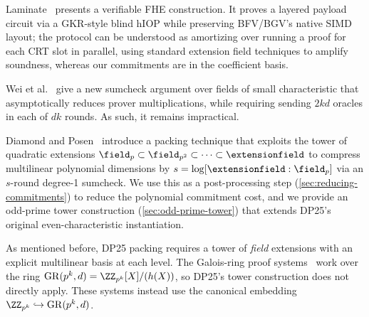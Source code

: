 
Laminate~\cite{EPRINT:PLFT25} presents a verifiable FHE construction. It proves a layered payload circuit via a GKR-style blind hIOP while preserving BFV/BGV's native SIMD layout; the protocol can be understood as amortizing over running a proof for each CRT slot in parallel, using standard extension field techniques to amplify soundness, whereas our commitments are in the coefficient basis.

Wei et al.~\cite{EPRINT:WWXZDZ25} give a new sumcheck argument over fields of small characteristic that asymptotically reduces prover multiplications, while requiring sending $2kd$ oracles in each of $dk$ rounds. As such, it remains impractical.

Diamond and Posen~\cite{EC:DiaPos25} introduce a packing technique that exploits the tower of quadratic extensions $\field_p \subset \field_{p^2} \subset \cdots \subset \extensionfield$ to compress multilinear polynomial dimensions by $s = \log [\extensionfield : \field_p]$ via an $s$-round degree-1 sumcheck. We use this as a post-processing step (\cref{sec:reducing-commitments}) to reduce the polynomial commitment cost, and we provide an odd-prime tower construction (\cref{sec:odd-prime-tower}) that extends DP25's original even-characteristic instantiation.

As mentioned before, DP25 packing requires a tower of \emph{field} extensions with an explicit multilinear basis at each level. The Galois-ring proof systems~\cite{C:JLXYY25,PKC:WeiZhaDen25,ESORICS:WZDWZY25} work over the ring $\mathrm{GR}(p^k, d) = \ZZ_{p^k}[X]/(h(X))$, so DP25's tower construction does not directly apply. These systems instead use the canonical embedding $\ZZ_{p^k} \hookrightarrow \mathrm{GR}(p^k, d)$.